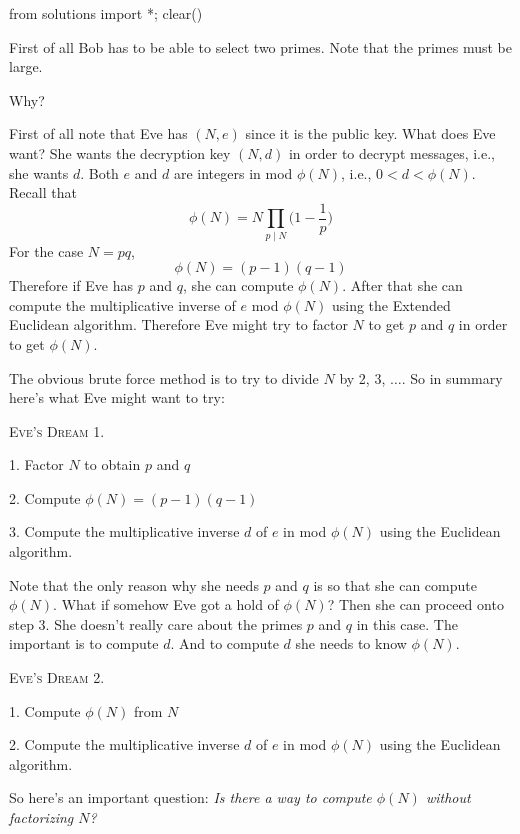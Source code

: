 \begin{python0}
from solutions import *; clear()
\end{python0}

First of all Bob has to be able to select two primes. Note that
the primes must be large. 

Why? 

First of all note that Eve has $(N,e)$ since it is the public key.
What does Eve want?
She wants the decryption key $(N, d)$ in order to decrypt messages, i.e.,
she wants $d$.
Both $e$ and $d$ are integers in mod $\phi(N)$, i.e., $0 < d < \phi(N)$. 
Recall that
\[
 \phi(N) = N \prod_{p \mid N } \biggl( 1 - \frac{1}{p}\biggr)
\]
For the case $N = pq$, 
\[
\phi(N) = (p-1)(q-1)
\]
Therefore if Eve has $p$ and $q$, she can compute
$\phi(N)$.
After that she can compute the multiplicative inverse of 
$e$ mod $\phi(N)$ using the Extended Euclidean algorithm.
Therefore Eve might try to factor $N$ to get $p$ and $q$ in order to get $\phi(N)$.

The obvious brute force method is to try to divide $N$ by 2, 3, $\ldots$.
So in summary here's what Eve might want to try:

\textsc{Eve's Dream 1}.
\begin{tightlist}
\item[1.] Factor $N$ to obtain $p$ and $q$
\item[2.] Compute $\phi(N) = (p-1)(q-1)$
\item[3.] Compute the multiplicative inverse $d$ of $e$ in mod $\phi(N)$ using
 the Euclidean algorithm.
\end{tightlist}

Note that the only reason why she needs $p$ and $q$ is so that she can compute 
$\phi(N)$.
What if somehow Eve got a hold of $\phi(N)$?
Then she can proceed onto step 3.
She doesn't really care about the primes $p$ and $q$ in this case.
The important is to compute $d$.
And to compute $d$ she needs to know $\phi(N)$.

\textsc{Eve's Dream 2}.
\begin{tightlist}
\item[1.] Compute $\phi(N)$ from $N$
\item[2.] Compute the multiplicative inverse $d$ of $e$ in mod $\phi(N)$ using
 the Euclidean algorithm.
\end{tightlist}

So here's an important question:
\textit{Is there a way to compute $\phi(N)$ without factorizing $N$?}


